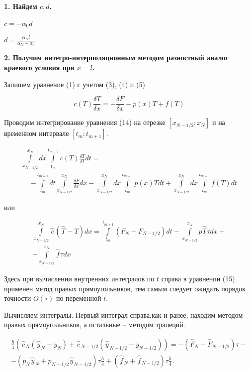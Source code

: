 \documentclass[a4paper,14pt]{article}
\begin{document}
\textbf{1. Найдем $c, d$.}

$c = -\alpha_0 d$

$d = \frac{\alpha_N l}{\alpha_N - \alpha_0}$.

\textbf{2. Получим интегро-интерполяционным методом разностный
аналог краевого условия при $x = l$.}

Запишем уравнение (1) с учетом (3), (4) и (5)

\begin{equation}
	c(T) \frac{\delta T}{\delta x} = - \frac{\delta F}{\delta x} - p(x) T + f(T)
\end{equation}


Проводим интегрирование уравнения (14) на отрезке $[x_{N-1/2}; x_N]$
и на временном интервале $[t_m; t_{m+1}]$.

 \begin{eqnarray}
	\int\limits_{x_{N-1/2}}^{x_N} dx \int\limits_{t_m}^{t_{m+1}} c(T) \frac{\delta T}{\delta t} dt = \nonumber \\
	= - \int\limits_{t_m}^{t_{m+1}} dt \int\limits_{x_{N-1/2}}^{x_N} \frac{\delta F}{\delta x} dx - \int\limits_{x_{N-1/2}}^{x_N} dx \int\limits_{t_m}^{t_{m+1}} p(x) T dt + \int\limits_{x_{N-1/2}}^{x_N} dx \int\limits_{t_m}^{t_{m+1}} f(T) dt
 \end{eqnarray}

или

\begin{eqnarray}
	\int\limits_{x_{N-1/2}}^{x_N} \stackrel{\frown}{c} (\stackrel{\frown}{T} - T) dx = \int\limits_{t_m}^{t_{m+1}} (F_{N} - F_{N-1/2}) dt - \int\limits_{x_{N-1/2}}^{x_N} p \stackrel{\frown}{T} \tau dx + \nonumber \\
	+ \int\limits_{x_{N-1/2}}^{x_N} \stackrel{\frown}{f} \tau dx
\end{eqnarray}

Здесь  при  вычислении  внутренних  интегралов  по $t$ справа  в  уравнении (15)
применен метод правых прямоугольников, тем самым следует ожидать порядок точности 
$O(\tau)$ по переменной $t$.

Вычисляем интегралы. Первый интеграл  справа,как и ранее, находим методом правых прямоугольников, а остальные -- методом трапеций.

\begin{eqnarray}
	\frac{h}{4} \left( \stackrel{\frown}{c}_N (\stackrel{\frown}{y}_N - y_N) + \stackrel{\frown}{c}_{N-1/2} (\stackrel{\frown}{y}_{N-1/2} - y_{N-1/2}) \right) = - (\stackrel{\frown}{F}_N - \stackrel{\frown}{F}_{N-1/2}) \tau - \nonumber \\
	- (p_N \stackrel{\frown}{y}_N + p_{N-1/2} \stackrel{\frown}{y}_{N-1/2} ) \tau \frac{h}{4} + (\stackrel{\frown}{f}_N + \stackrel{\frown}{f}_{N-1/2}) \tau \frac{h}{4}.
\end{eqnarray}
\end{document}
